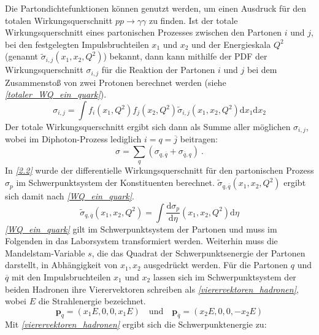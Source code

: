 Die Partondichtefunktionen können genutzt werden, um einen Ausdruck für den totalen Wirkungsquerschnitt $pp \rightarrow \gamma \gamma $ zu finden. Ist der totale Wirkungsquerschnitt eines partonischen Prozesses zwischen den Partonen $i$ und $j$, bei den festgelegten Impulsbruchteilen $x_1$ und $x_2$ und der Energieskala $Q^2$ (genannt $\tilde{\sigma}_{i,j}(x_1, x_2, Q^2)$) bekannt, dann kann mithilfe der PDF der Wirkungsquerschnitt $\sigma_{i,j}$ für die Reaktion der Partonen $i$ und $j$ bei dem Zusammenstoß von zwei Protonen berechnet werden (siehe \textit{\autoref{totaler_WQ_ein_quark}}).
\begin{equation}
\sigma_{i,j} = \int f_i(x_1, Q^2)f_j(x_2, Q^2) \tilde{\sigma}_{i,j}(x_1, x_2, Q^2)\text{d}x_1\text{d}x_2
\label{totaler_WQ_ein_quark}
\end{equation}
Der totale Wirkungsquerschnitt ergibt sich dann als Summe aller möglichen $\sigma_{i,j}$, wobei im Diphoton-Prozess lediglich $i=q=\overline{j}$ beitragen:  
\begin{equation}
\sigma = \sum_{q} \left(\sigma_{q,\overline{q}} + \sigma_{\overline{q},q} \right)~. 
\label{totaler_WQ_als_summe}
\end{equation}
In \textit{\autoref{2.2}} wurde der differentielle Wirkungsquerschnitt für den partonischen Prozess $\sigma_p$ im Schwerpunktsystem der Konstituenten berechnet. $\tilde{\sigma}_{q,\overline{q}}(x_1, x_2, Q^2)$ ergibt sich damit nach \textit{\autoref{WQ_ein_quark}}.
\begin{equation}
\tilde{\sigma}_{q,\overline{q}}(x_1, x_2, Q^2) = \int \frac{\text{d}\sigma_{p}}{\text{d}\eta}\left(x_1,x_2, Q^2\right)\text{d} \eta
\label{WQ_ein_quark}
\end{equation}
\textit{\autoref{WQ_ein_quark}} gilt im Schwerpunktsystem der Partonen und muss im Folgenden in das Laborsystem transformiert werden. Weiterhin muss die Mandelstam-Variable $s$, die das Quadrat der Schwerpunktsenergie der Partonen darstellt, in Abhängigkeit von $x_1, x_2$ ausgedrückt werden. Für die Partonen $q$ und $\overline{q}$ mit den Impulsbruchteilen $x_1$ und $x_2$ lassen sich im Schwerpunktsystem der beiden Hadronen ihre Vierervektoren schreiben als \textit{\autoref{vierervektoren_hadronen}}, wobei $E$ die Strahlenergie bezeichnet.
\begin{equation}
\textbf{p}_q = \left(x_1E, 0, 0, x_1E\right) \quad \text{und} \quad \textbf{p}_{\overline{q}} = \left(x_2E, 0, 0, -x_2E\right)
\label{vierervektoren_hadronen}
\end{equation}
Mit \textit{\autoref{vierervektoren_hadronen}} ergibt sich die Schwerpunktenergie zu:
